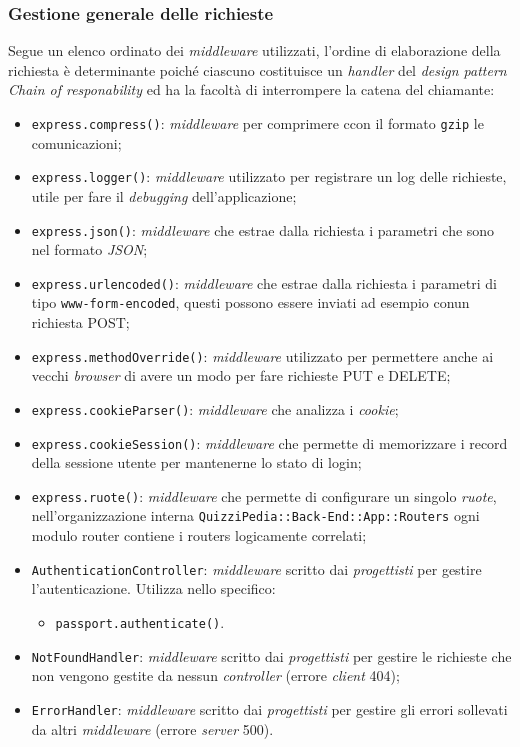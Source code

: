 \subsubsection{Gestione generale delle richieste}
Segue un elenco ordinato dei \textit{middleware} utilizzati, l'ordine di elaborazione della richiesta è determinante poiché ciascuno costituisce un \textit{handler} del \textit{design pattern} \textit{Chain of responability} ed ha la facoltà di interrompere la catena del chiamante:

\begin{itemize}
	\item \texttt{express.compress()}: \textit{middleware} per comprimere ccon il formato \texttt{gzip} le comunicazioni;
	\item \texttt{express.logger()}: \textit{middleware} utilizzato per registrare un log delle richieste, utile per fare il \textit{debugging} dell'applicazione;
	\item \texttt{express.json()}: \textit{middleware} che estrae dalla richiesta i parametri che sono nel formato \textit{JSON};
	\item \texttt{express.urlencoded()}: \textit{middleware} che estrae dalla richiesta i parametri di tipo \texttt{www-form-encoded}, questi possono essere inviati ad esempio conun richiesta POST;
	\item \texttt{express.methodOverride()}: \textit{middleware} utilizzato per permettere anche ai vecchi \textit{browser} di avere un modo per fare richieste PUT e DELETE;
	\item \texttt{express.cookieParser()}: \textit{middleware} che analizza i \textit{cookie};
	\item \texttt{express.cookieSession()}: \textit{middleware} che permette di memorizzare i record della sessione utente per mantenerne lo stato di login;
	\item \texttt{express.ruote()}: \textit{middleware} che permette di configurare un singolo \textit{ruote}, nell'organizzazione interna \texttt{QuizziPedia::Back-End::App::Routers} ogni modulo router contiene i routers logicamente correlati;
	\item \texttt{AuthenticationController}: \textit{middleware} scritto dai \textit{progettisti} per gestire l'autenticazione. Utilizza nello specifico:
			\begin{itemize}
				\item \texttt{passport.authenticate()}.
			\end{itemize}
	\item \texttt{NotFoundHandler}: \textit{middleware} scritto dai \textit{progettisti} per gestire le richieste che non vengono gestite da nessun \textit{controller} (errore \textit{client} 404);
	\item \texttt{ErrorHandler}: \textit{middleware} scritto dai \textit{progettisti} per gestire gli errori sollevati da altri \textit{middleware} (errore \textit{server} 500).
\end{itemize}

